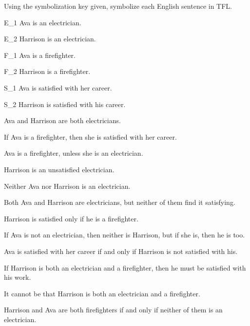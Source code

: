 \solutions

\problempart Using the symbolization key given, symbolize each English sentence in TFL.\label{pr.avacareer}
	\begin{ekey}
		\item[E_1] Ava is an electrician.
		\item[E_2] Harrison is an electrician.
		\item[F_1] Ava is a firefighter.
		\item[F_2] Harrison is a firefighter.
		\item[S_1] Ava is satisfied with her career.
		\item[S_2] Harrison is satisfied with his career.
	\end{ekey}
\begin{earg}
\item Ava and Harrison are both electricians.
\item[] 
\item If Ava is a firefighter, then she is satisfied with her career.
\item[] 
\item Ava is a firefighter, unless she is an electrician.
\item[] 
\item Harrison is an unsatisfied electrician.
\item[] 
\item Neither Ava nor Harrison is an electrician.
\item[] 
\item Both Ava and Harrison are electricians, but neither of them find it satisfying.
\item[] 
\item Harrison is satisfied only if he is a firefighter.
\item[] 
\item If Ava is not an electrician, then neither is Harrison, but if she is, then he is too.
\item[] 
\item Ava is satisfied with her career if and only if Harrison is not satisfied with his.
\item[] 
\item If Harrison is both an electrician and a firefighter, then he must be satisfied with his work.
\item[] 
\item It cannot be that Harrison is both an electrician and a firefighter.
\item[] 
\item Harrison and Ava are both firefighters if and only if neither of them is an electrician.
\item[] 
\end{earg}

